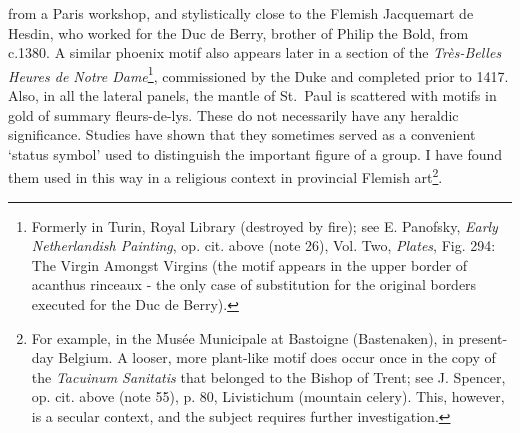\documentclass[a4paper,12pt]{article}
\begin{document}
from a Paris workshop, and stylistically close to
the Flemish Jacquemart de Hesdin, who worked for the Duc de Berry,
brother of Philip the Bold, from c.1380. A similar phoenix motif also
appears later in a section of the \textit{Tr\`es-Belles Heures de Notre
Dame}\footnote{Formerly in Turin, Royal Library (destroyed by fire);
see E. Panofsky, \textit{Early Netherlandish Painting}, op. cit. above
(note 26), Vol. Two, \textit{Plates}, Fig. 294: The Virgin Amongst
Virgins (the motif appears in the upper border of acanthus rinceaux -
the only case of substitution for the original borders executed for
the Duc de Berry).}, commissioned by the Duke and completed prior to
1417. Also, in all the lateral panels, the mantle of St.~Paul is
scattered with motifs in gold of summary fleurs-de-lys. These do not
necessarily have any heraldic significance. Studies have shown that
they sometimes served as a convenient `status symbol' used to
distinguish the important figure of a group.  I have found them used
in this way in a religious context in provincial Flemish
art\footnote{For example, in the Mus\'ee Municipale at Bastoigne
(Bastenaken), in present-day Belgium. A looser, more plant-like motif
does occur once in the copy of the \textit{Tacuinum Sanitatis} that
belonged to the Bishop of Trent; see J. Spencer, op. cit. above (note
55), p. 80, Livistichum (mountain celery). This, however, is a secular
context, and the subject requires further investigation.}.
\end{document}
